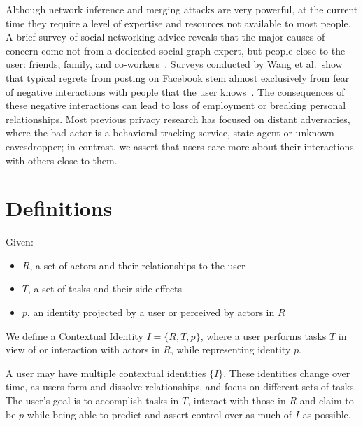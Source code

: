 \documentclass{llncs}
\begin{document}
\begin{comment}TODO: figure out how to cite this. Why is this short
paper's model worth pursuing? It's simpler, and focuses on the user rather
than data.
\end{comment}

Although network inference and merging attacks are very powerful, at the
current time they require a level of expertise and resources not available to
most people. A brief survey of social networking
advice reveals that the
major causes of concern come not from a dedicated social graph expert, but people
close to the user: friends, family, and co-workers~\cite{fbtips2,fbtips1}.
Surveys conducted by Wang et al.~show that typical regrets from posting on
Facebook stem almost exclusively from fear of negative interactions with people
that the user knows~\cite{wang}. The consequences of these negative
interactions can lead to loss of employment or breaking personal relationships.
Most previous privacy research has focused on distant adversaries, where the
bad actor is a behavioral tracking service, state agent or unknown
eavesdropper; in contrast, we assert that users care more about their
interactions with others close to them.

\section{Definitions}

\begin{definition}
  Given:
  \begin{itemize}
    \item $R$, a set of actors and their relationships to the user
    \item $T$, a set of tasks and their side-effects
    \item $p$, an identity projected by a user or perceived by actors in $R$
  \end{itemize}
\medskip

  We define a Contextual Identity $I = \{R,T,p\}$, where a user performs tasks
$T$ in view of or interaction with actors in $R$, while representing identity
$p$.  

\end{definition}

A user may have multiple contextual identities $\{I\}$. These identities change
over time, as users form and dissolve relationships, and focus on different
sets of tasks. The user's goal is to accomplish tasks in $T$,
interact with those in $R$ and claim to be $p$  while being able to predict and
assert control over as much of $I$ as possible.
\end{document}
